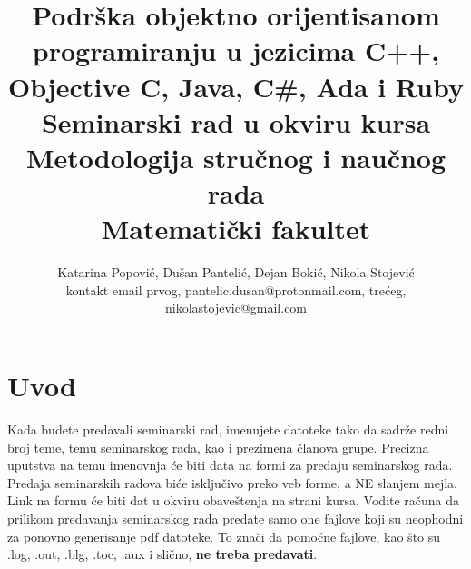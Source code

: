 \documentclass[a4paper]{article}
\begin{document}
\title{\Large Podrška objektno orijentisanom programiranju u jezicima C++, Objective C, Java, C\#, Ada i Ruby\\ \small{Seminarski rad u okviru kursa\\Metodologija stručnog i naučnog rada\\ Matematički fakultet}}

\author{Katarina Popović, Dušan Pantelić, Dejan Bokić, Nikola Stojević\\ kontakt email prvog, pantelic.dusan@protonmail.com, trećeg, nikolastojevic@gmail.com}


\maketitle


\tableofcontents

\newpage

\section{Uvod}
\label{sec:uvod}

Kada budete predavali seminarski rad, imenujete datoteke tako da sadrže redni broj teme, temu seminarskog rada, kao i prezimena članova grupe. Precizna uputstva na temu imenovnja će biti data na formi za predaju seminarskog rada. Predaja seminarskih radova biće isključivo preko veb forme, a NE slanjem mejla. Link na formu će biti dat u okviru obaveštenja na strani kursa. Vodite računa da prilikom predavanja seminarskog rada predate samo one fajlove koji su neophodni za ponovno generisanje pdf datoteke. To znači da pomoćne fajlove, kao što su .log, .out, .blg, .toc, .aux i slično, \textbf{ne treba predavati}.
\end{document}
